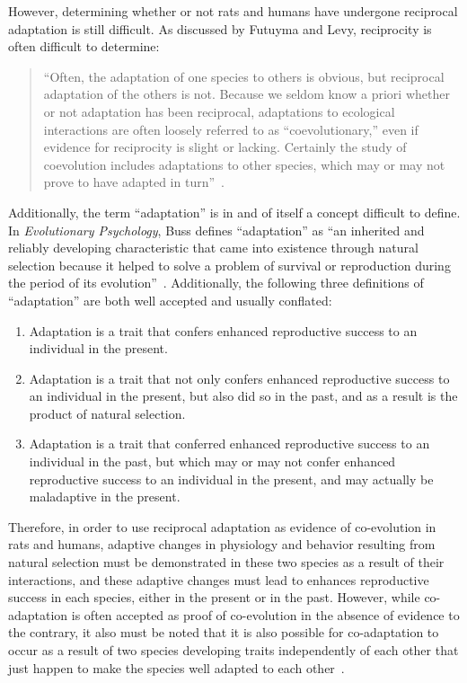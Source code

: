 \documentclass[12pt]{article}
\begin{document}
However, determining whether or not rats and humans have undergone reciprocal adaptation is still difficult. As discussed by Futuyma and Levy, reciprocity is often difficult to determine:

\begin{quote}
``Often, the adaptation of one species to others is obvious, but reciprocal adaptation of the others is not. Because we seldom know a priori whether or not adaptation has been reciprocal, adaptations to ecological interactions are often loosely referred to as ``coevolutionary,'' even if evidence for reciprocity is slight or lacking. Certainly the study of coevolution includes adaptations to other species, which may or may not prove to have adapted in turn''~\cite{FutuymaLevy2001}.
\end{quote}

Additionally, the term ``adaptation'' is in and of itself a concept difficult to define. In \textit{Evolutionary Psychology}, Buss defines ``adaptation'' as ``an inherited and reliably developing characteristic that came into existence through natural selection because it helped to solve a problem of survival or reproduction during the period of its evolution''~\cite{Buss2004}. Additionally, the following three definitions of ``adaptation'' are both well accepted and usually conflated:
\begin{enumerate}
\item Adaptation is a trait that confers enhanced reproductive success to an individual in the present.
\item Adaptation is a trait that not only confers enhanced reproductive success to an individual in the present, but also did so in the past, and as a result is the product of natural selection.
\item Adaptation is a trait that conferred enhanced reproductive success to an individual in the past, but which may or may not confer enhanced reproductive success to an individual in the present, and may actually be maladaptive in the present.
\end{enumerate}
Therefore, in order to use reciprocal adaptation as evidence of co-evolution in rats and humans, adaptive changes in physiology and behavior resulting from natural selection must be demonstrated in these two species as a result of their interactions, and these adaptive changes must lead to enhances reproductive success in each species, either in the present or in the past. However, while co-adaptation is often accepted as proof of co-evolution in the absence of evidence to the contrary, it also must be noted that it is also possible for co-adaptation to occur as a result of two species developing traits independently of each other that just happen to make the species well adapted to each other~\cite{SparkNotes}.
\end{document}
